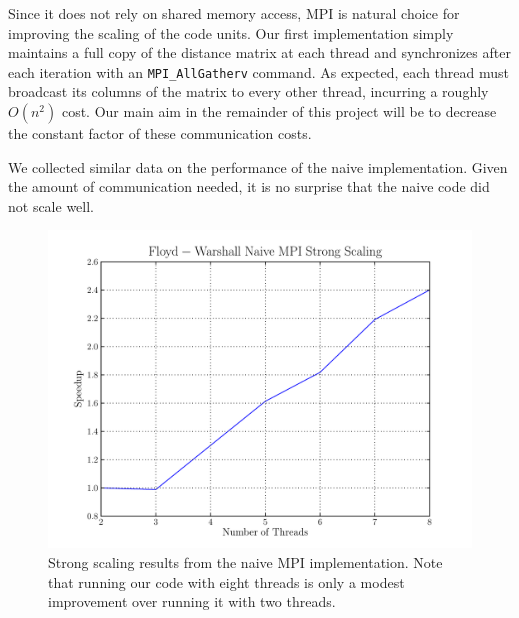 \documentclass[12pt]{article}
\begin{document}
Since it does not rely on shared memory access, MPI is natural choice for
improving the scaling of the code units. Our first implementation simply maintains
a full copy of the distance matrix at each thread and synchronizes after
each iteration with an {\tt MPI\_AllGatherv} command. As expected, each thread
must broadcast its columns of the matrix to every other thread, incurring
a roughly $O(n^2)$ cost. Our main aim in the remainder of this project will
be to decrease the constant factor of these communication costs.

\vspace{0.75em}
\noindent We collected similar data on the performance of the naive implementation.
Given the amount of communication needed, it is no surprise that the naive code
did not scale well.

\begin{figure}[h!]
  \centering
  \includegraphics[scale=0.7]{../profiling/naive/naive_strong.pdf}
  \caption{Strong scaling results from the naive MPI implementation. Note
    that running our code with eight threads is only a modest improvement
    over running it with two threads.}
\end{figure}
\end{document}
